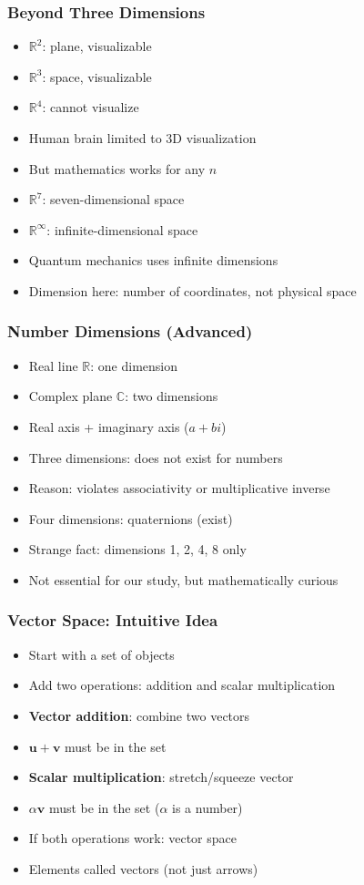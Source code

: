 \begin{frame}[fragile]\frametitle{Beyond Three Dimensions}
  \begin{itemize}
    \item $\mathbb{R}^2$: plane, visualizable
    \item $\mathbb{R}^3$: space, visualizable
    \item $\mathbb{R}^4$: cannot visualize
    \item Human brain limited to 3D visualization
    \item But mathematics works for any $n$
    \item $\mathbb{R}^7$: seven-dimensional space
    \item $\mathbb{R}^\infty$: infinite-dimensional space
    \item Quantum mechanics uses infinite dimensions
    \item Dimension here: number of coordinates, not physical space
  \end{itemize}
\end{frame}

\begin{frame}[fragile]\frametitle{Number Dimensions (Advanced)}
  \begin{itemize}
    \item Real line $\mathbb{R}$: one dimension
    \item Complex plane $\mathbb{C}$: two dimensions
    \item Real axis + imaginary axis ($a + bi$)
    \item Three dimensions: does not exist for numbers
    \item Reason: violates associativity or multiplicative inverse
    \item Four dimensions: quaternions (exist)
    \item Strange fact: dimensions 1, 2, 4, 8 only
    \item Not essential for our study, but mathematically curious
  \end{itemize}
\end{frame}

\begin{frame}[fragile]\frametitle{Vector Space: Intuitive Idea}
  \begin{itemize}
    \item Start with a set of objects
    \item Add two operations: addition and scalar multiplication
    \item \textbf{Vector addition}: combine two vectors
    \item $\mathbf{u} + \mathbf{v}$ must be in the set
    \item \textbf{Scalar multiplication}: stretch/squeeze vector
    \item $\alpha \mathbf{v}$ must be in the set ($\alpha$ is a number)
    \item If both operations work: vector space
    \item Elements called vectors (not just arrows)
  \end{itemize}
\end{frame}

